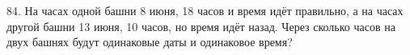 84. На часах одной башни 8 июня, 18 часов и время идёт правильно, а на часах другой башни 13 июня, 10 часов, но время идёт назад. Через сколько часов на двух башнях будут одинаковые даты и одинаковое время?\\
